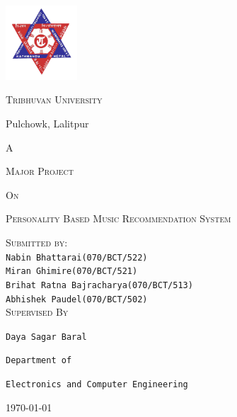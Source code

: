 \documentclass[a4paper, 12pt, onepage]{article}
\begin{document}
\begin{titlepage}
  \centering
  \includegraphics[width=0.2\textwidth]{tu_logo.png}\par
  {\large\scshape Tribhuvan University\par}
  \vspace{0.3cm}
  {\large Pulchowk, Lalitpur \par}
  \vspace{3cm}
  	{\large\scshape A\par}
	{\large\scshape Major Project\par}
        {\large\scshape On\par}
        {\large\scshape Personality Based Music Recommendation System\par}
	\vspace{2.5cm}
        {\large\scshape Submitted by:}\\
        \vspace{0.2cm}
        {
          {\normalsize\verb+Nabin Bhattarai(070/BCT/522)+}\\
          \vspace{0.1cm}
          {\normalsize\verb+Miran Ghimire(070/BCT/521)+}\\
          \vspace{0.1cm}
          {\normalsize\verb+Brihat Ratna Bajracharya(070/BCT/513)+}\\
          \vspace{0.1cm}
          {\normalsize\verb+Abhishek Paudel(070/BCT/502)+}\\
          \vspace{0.1cm}
        }
        \vspace{1cm}
        {\large\scshape Supervised By}\\
        \vspace{0.2cm}
        {
          {\normalsize \verb+Daya Sagar Baral+\par}
          \vspace{0.1cm}
          {\normalsize \verb+Department of+\par}
          \vspace{0.1cm}
          {\normalsize\verb+Electronics and Computer Engineering+}
          \vspace{0.1cm}
        }
        
        \vspace{1cm}
        \vfill

	{\normalsize \today\par}
      \end{titlepage}
\end{document}
